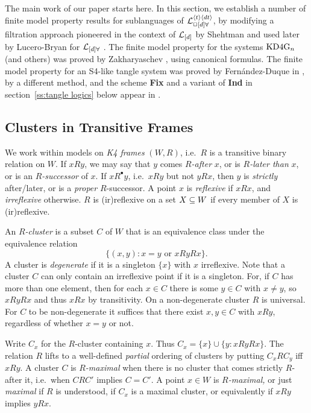 





The main work of our paper starts here.
In this section, we establish a number of finite model property results
for sublanguages of ${\cal L}^{{\langle t\rangle}{\langle dt\rangle}}_{\Box{[d]}\forall}$, by modifying a filtration approach 
pioneered in the context of ${\cal L}_{[d]}$ by Shehtman \cite{Sheh:d90}
and used later by Lucero-Bryan for ${\cal L}_{{[d]}\forall}$ \cite{LucBry11}.
The finite model property for the systems  $\mathrm{K}\mathrm{D}4\mathrm{G}_n$ (and others)
was proved by Zakharyaschev \cite{Zakh93}, using canonical formulas.
 The finite model property for an S4-like tangle system
 was proved by Fern\'andez-Duque in \cite{FD:ijcai11}, by a different method,
 and the scheme {\bf Fix} and a variant of {\bf Ind} 
 in section~\ref{ss:tangle logics} below
appear in \cite[\S3]{FD:ijcai11}.





\subsection{Clusters in Transitive Frames}    
We work within models on \emph{K4 frames} $(W,R)$, i.e.\ $R$ is a  transitive binary relation on $W$. 
If $xRy$, we may say that $y$ comes \emph{$R$-after} $x$, or is \emph{$R$-later than} $x$, or is an \emph{$R$-successor} of $x$. If $xR^\bullet y$, i.e.\ $xRy$ but not $yRx$, then $y$ is \emph{strictly} after/later, or is a \emph{proper} $R$-successor. A point $x$ is \emph{reflexive} if $xRx$, and \emph{irreflexive} otherwise. $R$ is (ir)reflexive on a set $X\subseteq W$ if every member of $X$ is (ir)reflexive.

An \emph{$R$-cluster} is a subset $C$ of $W$ that is an equivalence class under the equivalence relation
$$
\{(x,y):x=y\text{ or } xRyRx\}.
$$
A cluster is \emph{degenerate} if it is a singleton $\{x\}$ with $x$ irreflexive. Note that a cluster $C$ can only contain an irreflexive point if it is a singleton. For,  if $C$ has more than one element, then for each $x\in C$ there is some $y\in C$ with $x\ne y$, so $xRyRx$ and thus $xRx$ by transitivity. On a non-degenerate cluster $R$ is universal. For $C$ to be non-degenerate it suffices that there exist $x,y\in C$ with $xRy$, regardless of whether $x=y$ or not.

Write $C_x$ for the $R$-cluster containing $x$. Thus $C_x=\{x\}\cup\{y:xRyRx\}$. The relation $R$ lifts to a well-defined \emph{partial} ordering of clusters   by putting $C_xRC_y$ iff $xRy$.  A cluster $C$ is \emph{$R$-maximal} when there is no cluster that  comes strictly $R$-after it, i.e.\ when $CRC'$ implies $C=C'$. A point $x\in W$ is \emph{$R$-maximal,}
or just \emph{maximal} if $R$ is understood, if $C_x$ is a maximal cluster, or equivalently if $xRy$ implies $yRx$.

